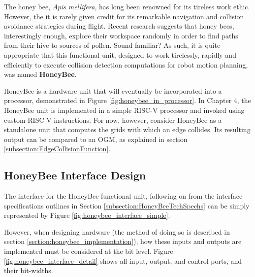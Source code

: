 


The honey bee, \textit{Apis mellifera}, has long been renowned for its tireless work ethic. However, the it is rarely given credit for its remarkable navigation and collision avoidance strategies during flight. Recent research\cite{Menzel2005} suggests that honey bees, interestingly enough, explore their workspace randomly in order to find paths from their hive to sources of pollen. Sound familiar? As such, it is quite appropriate that this functional unit, designed to work tirelessly, rapidly and efficiently to execute collision detection computations for robot motion planning, was named \textbf{HoneyBee}. \\
\bigskip

HoneyBee is a hardware unit that will eventually be incorporated into a processor, demonstrated in Figure \ref{fig:honeybee_in_processor}. In Chapter 4, the HoneyBee unit is implemented in a simple RISC-V processor and invoked using custom RISC-V instructions. For now, however, consider HoneyBee as a standalone unit that computes the grids with which an edge collides. Its resulting output can be compared to an \gls{OGM}, as explained in section \ref{subsection:EdgeCollisionFunction}.



\subsection{HoneyBee Interface Design}
    The interface for the HoneyBee functional unit, following on from the interface specifications outlines in Section \ref{subsection:HoneyBeeTechSpechs} can be simply represented by Figure \ref{fig:honeybee_interface_simple}.

    
    
    However, when designing hardware (the method of doing so is described in section \ref{section:honeybee_implementation}), how these inputs and outputs are implemented must be considered at the \gls{bit} level. Figure \ref{fig:honeybee_interface_detail} shows all input, output, and control ports, and their \glspl{bit-width}. 
    
    

